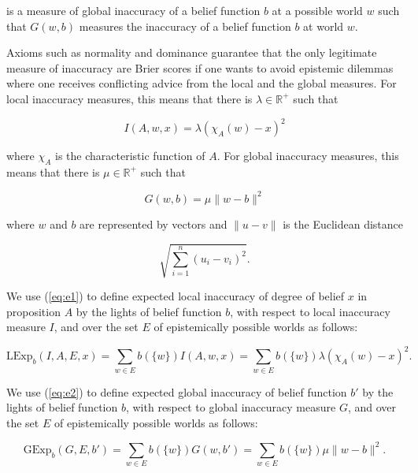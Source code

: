 \documentclass[phd,12pt,oneside]{ubcthesis}
\begin{document}
{\noindent}is a measure of global inaccuracy of a belief function $b$
at a possible world $w$ such that $G(w,b)$ measures the inaccuracy of
a belief function $b$ at world $w$.

Axioms such as normality and dominance guarantee that the only
legitimate measure of inaccuracy are Brier scores if one wants to
avoid epistemic dilemmas where one receives conflicting advice from
the local and the global measures. For local inaccuracy measures, this
means that there is $\lambda\in\mathbb{R}^{+}$ such that

\begin{equation}
  \label{eq:e1}
  I(A,w,x)=\lambda\left(\chi_{A}(w)-x\right)^{2}
\end{equation}

{\noindent}where $\chi_{A}$ is the characteristic function of $A$. For global
inaccuracy measures, this means that there is $\mu\in\mathbb{R}^{+}$
such that

\begin{equation}
  \label{eq:e2}
  G(w,b)=\mu\|w-b\|^{2}
\end{equation}

where $w$ and $b$ are represented by vectors and $\|u-v\|$ is the
Euclidean distance

\begin{equation}
  \label{eq:e3}
  \sqrt{\sum_{i=1}^{n}\left(u_{i}-v_{i}\right)^{2}}.
\end{equation}

We use (\ref{eq:e1}) to define expected local inaccuracy of degree of
belief $x$ in proposition $A$ by the lights of belief function $b$,
with respect to local inaccuracy measure $I$, and over the set $E$ of
epistemically possible worlds as follows:

\begin{equation}
  \label{eq:eli}
  \mbox{LExp}_{b}(I,A,E,x)=\sum_{w\in{}E}b(\{w\})I(A,w,x)=\sum_{w\in{}E}b(\{w\})\lambda\left(\chi_{A}(w)-x\right)^{2}.
\end{equation}

We use (\ref{eq:e2}) to define expected global inaccuracy of belief
function $b'$ by the lights of belief function $b$, with respect to
global inaccuracy measure $G$, and over the set $E$ of epistemically
possible worlds as follows:

\begin{equation}
  \label{eq:egi}
  \mbox{GExp}_{b}(G,E,b')=\sum_{w\in{}E}b(\{w\})G(w,b')=\sum_{w\in{}E}b(\{w\})\mu\|w-b\|^{2}.
\end{equation}
\end{document}
